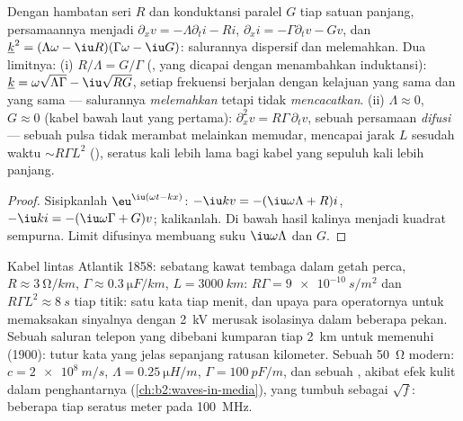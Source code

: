 \begin{proposition}\label{prop:b2:dispersion-wave-packets:lossy}
Dengan hambatan seri $R$ dan konduktansi paralel $G$ tiap satuan
panjang, persamaannya menjadi $\partial_xv = -\Lambda\partial_ti - Ri$, $\partial_xi =
-\Gamma\partial_tv - Gv$, dan  $\underline k^2 = (\Lambda\omega -
\iu R)(\Gamma\omega - \iu G)$: salurannya dispersif dan melemahkan. Dua
limitnya: (i) $R/\Lambda = G/\Gamma$ (, yang dicapai dengan menambahkan
induktansi): $\underline k = \omega\sqrt{\Lambda\Gamma} - \iu\sqrt{RG}$, setiap frekuensi
berjalan dengan kelajuan yang sama dan  yang sama --- salurannya
\emph{melemahkan} tetapi tidak \emph{mencacatkan}. (ii) $\Lambda \approx 0$, $G \approx 0$
(kabel bawah laut yang pertama): $\partial_x^2v = R\Gamma\,\partial_tv$, sebuah
persamaan \emph{difusi} --- sebuah pulsa tidak merambat melainkan memudar,
mencapai jarak $L$ sesudah waktu $\sim R\Gamma L^2$ (), seratus kali lebih lama bagi kabel yang sepuluh kali lebih panjang.
\end{proposition}

\begin{proof}
Sisipkanlah $\eu^{\iu(\omega t - kx)}$: $-\iu kv = -(\iu\omega\Lambda + R)i$, $-\iu ki = -(\iu
\omega\Gamma + G)v$; kalikanlah. Di bawah  hasil kalinya menjadi
kuadrat sempurna. Limit difusinya membuang suku $\iu\omega\Lambda$ dan $G$.
\end{proof}

\begin{example}\label{ex:b2:dispersion-wave-packets:cables}
Kabel lintas Atlantik 1858: sebatang kawat tembaga dalam getah perca,
$R \approx \qty{3}{\ohm/km}$, $\Gamma \approx \qty{0.3}{\micro F/km}$, $L = \qty{3000}{km}$:
$R\Gamma = \qty{9e-10}{s/m^2}$ dan $R\Gamma L^2 \approx \qty{8}{s}$ tiap titik: satu kata tiap
menit, dan upaya para operatornya untuk memaksakan sinyalnya
dengan \qty{2}{kV} merusak isolasinya dalam beberapa pekan. Sebuah saluran telepon
yang dibebani kumparan tiap \qty{2}{km} untuk memenuhi 
(1900): tutur kata yang jelas sepanjang ratusan kilometer. Sebuah 
\qty{50}{\ohm} modern: $c = \qty{2e8}{m/s}$, $\Lambda = \qty{0.25}{\micro H/m}$, $\Gamma =
\qty{100}{pF/m}$, dan sebuah , akibat efek kulit dalam
penghantarnya (\cref{ch:b2:waves-in-media}), yang tumbuh sebagai $\sqrt f$: beberapa
 tiap seratus meter pada \qty{100}{MHz}.
\end{example}

